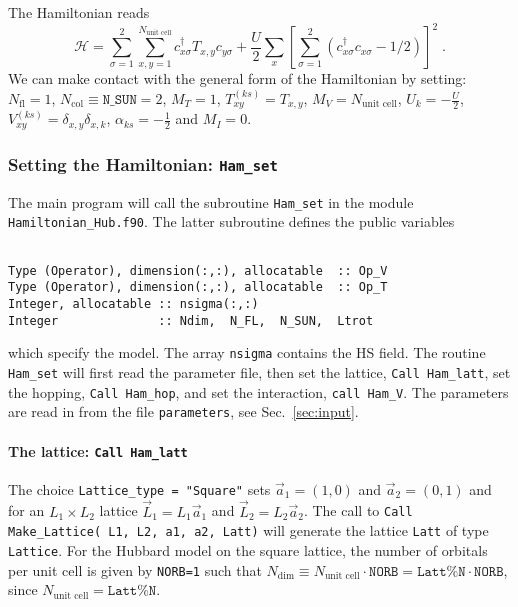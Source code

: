 \documentclass{SciPost}
\begin{document}
The Hamiltonian reads 
\begin{equation}
\label{eqn_hubbard_sun}
\mathcal{H}= 
\sum\limits_{\sigma=1}^{2} 
\sum\limits_{x,y =1 }^{N_{\text{unit cell}}} 
  c^{\dagger}_{x \sigma} T_{x,y}c^{\phantom\dagger}_{y \sigma} 
+ \frac{U}{2}\sum\limits_{x}\left[
\sum\limits_{\sigma=1}^{2}
\left(  c^{\dagger}_{x \sigma} c^{\phantom\dagger}_{x \sigma}  -1/2 \right) \right]^{2}\;.
\end{equation} 
We can make contact with the general form of the Hamiltonian by setting: 
$N_{\mathrm{fl}} = 1$, $N_{\mathrm{col}} \equiv \texttt{N\_SUN}     =2 $,   $M_T    =    1$,  $T^{(ks)}_{x y}   =  T_{x,y}$,  $M_V   =  N_{\text{unit cell}} $,  $U_{k}       =   -\frac{U}{2}$, 
 $V_{x y}^{(ks)} =  \delta_{x,y} \delta_{x,k}$,  $\alpha_{ks}   = - \frac{1}{2}  $ and $M_I       = 0 $.
%
\subsubsection{Setting the Hamiltonian:  \texttt{Ham\_set} }
%
The main program will call the subroutine   \texttt{Ham\_set} in the module \texttt{Hamiltonian\_Hub.f90}.
The latter  subroutine  defines the  public variables
\lstset{style=fortran}
\begin{lstlisting}

Type (Operator), dimension(:,:), allocatable  :: Op_V 
Type (Operator), dimension(:,:), allocatable  :: Op_T
Integer, allocatable :: nsigma(:,:)
Integer              :: Ndim,  N_FL,  N_SUN,  Ltrot

\end{lstlisting}
which specify the model. The array \texttt{nsigma} contains the HS field. The  routine \texttt{Ham\_set}  will first  read the parameter file,  then set the lattice, \texttt{Call Ham\_latt},  set the hopping, \texttt{Call Ham\_hop},  and set the interaction, 
\texttt{call Ham\_V}.  
The parameters are read in from the file \texttt{parameters}, see Sec.~\ref{sec:input}.
%
\paragraph{The lattice:   \texttt{Call Ham\_latt} }
%
The choice \texttt{Lattice\_type = "Square"} sets $\vec{a}_1 =  (1,0) $ and $\vec{a}_2 =  (0,1) $  and for an $L_1 \times L_2$  lattice  $\vec{L}_1 = L_1 \vec{a}_1$ and  $\vec{L}_2 = L_2 \vec{a}_2$.     The call to  \texttt{Call Make\_Lattice( L1, L2, a1,  a2, Latt)} will generate the lattice   \texttt{Latt} of type \texttt{Lattice}. 
For the Hubbard model on the square lattice, the number of orbitals per unit cell is given by \texttt{NORB=1} such that   $N_{\mathrm{dim}}   \equiv N_{\text{unit cell}}   \cdot \texttt{NORB}  = \texttt{Latt\%N} \cdot \texttt{NORB}$, since $N_{\text{unit cell}} = \texttt{Latt\%N}$.
\end{document}
